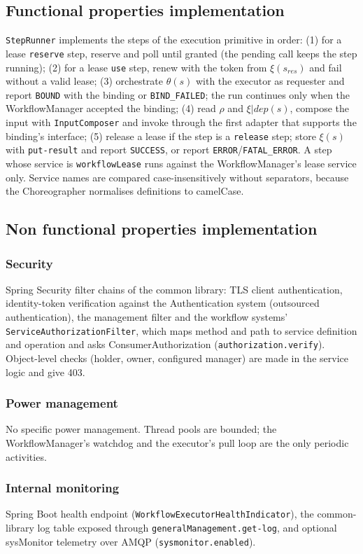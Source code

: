\documentclass[a4paper]{arrowhead}
\begin{document}
\subsection{Functional properties implementation}
\texttt{StepRunner} implements the steps of the execution primitive in order: (1) for a lease
\texttt{reserve} step, reserve and poll until granted (the pending call keeps the step running); (2) for a lease
\texttt{use} step, renew with the token from $\xi(s_{res})$ and fail without a valid lease; (3) orchestrate
$\theta(s)$ with the executor as requester and report \texttt{BOUND} with the binding or \texttt{BIND\_FAILED}; the run
continues only when the WorkflowManager accepted the binding; (4) read $\rho$ and $\xi|dep(s)$, compose the input with
\texttt{InputComposer} and invoke through the first adapter that supports the binding's interface; (5) release a
lease if the step is a \texttt{release} step; store $\xi(s)$ with \texttt{put-result} and report \texttt{SUCCESS}, or
report \texttt{ERROR}/\texttt{FATAL\_ERROR}. A step whose service is \texttt{workflowLease} runs against the
WorkflowManager's lease service only. Service names are compared case-insensitively without separators, because the
Choreographer normalises definitions to camelCase.

\subsection{Non functional properties implementation}
\subsubsection{Security}
Spring Security filter chains of the common library: TLS client authentication, identity-token verification against
the Authentication system (outsourced authentication), the management filter and the workflow systems'
\texttt{ServiceAuthorizationFilter}, which maps method and path to service definition and operation and asks
ConsumerAuthorization (\texttt{authorization.verify}). Object-level checks (holder, owner, configured manager) are made in
the service logic and give 403.
\subsubsection{Power management}
No specific power management. Thread pools are bounded; the WorkflowManager's watchdog and the executor's pull loop are
the only periodic activities.
\subsubsection{Internal monitoring}
Spring Boot health endpoint (\texttt{WorkflowExecutorHealthIndicator}),
the common-library log table exposed through \texttt{generalManagement.get-log}, and optional sysMonitor telemetry over
AMQP (\texttt{sysmonitor.enabled}).
\end{document}
